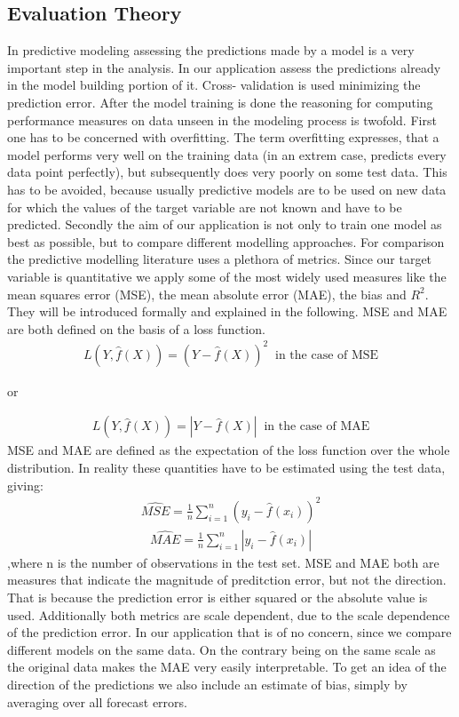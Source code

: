\subsection{Evaluation Theory}
In predictive modeling assessing the predictions made by a model is a very important step in the analysis. In our application assess the predictions already in the model building portion of it. Cross- validation is used minimizing the prediction error. After the model training is done the reasoning for computing performance measures on data unseen in the modeling process is twofold. First one has to be concerned with overfitting. The term overfitting expresses, that a model performs very well on the training data (in an extrem case, predicts every data point perfectly), but subsequently does very poorly on some test data. This has to be avoided, because usually predictive models are to be used on new data for which the values of the target variable are not known and have to be predicted. Secondly the aim of our application is not only to train one model as best as possible, but to compare different modelling approaches. For comparison the predictive modelling literature uses a plethora of metrics. Since our target variable is quantitative we apply some of the most widely used measures like the mean squares error (MSE), the mean absolute error (MAE), the bias and $R^2$. They will be introduced formally and explained in the following. MSE and MAE are both defined on the basis of a loss function. 
\begin{align*}
L(Y,\hat{f}(X))=(Y-\hat{f}(X))^2\;\; \text{in the case of MSE}
\end{align*}
\begin{center}
or
\end{center}
\begin{align*}
L(Y,\hat{f}(X))=|Y-\hat{f}(X)|\;\; \text{in the case of MAE}
\end{align*}
MSE and MAE are defined as the expectation of the loss function over the whole distribution. In reality these quantities have to be estimated using the test data, giving:
\begin{align}
\hat{MSE}=\frac{1}{n}\sum_{i=1}^n(y_i-\hat{f}(x_i))^2
\end{align}
\begin{align}
\hat{MAE}=\frac{1}{n}\sum_{i=1}^n|y_i-\hat{f}(x_i)|
\end{align}
,where n is the number of observations in the test set. MSE and MAE both are measures that indicate the magnitude of preditction error, but not the direction. That is because the prediction error is either squared or the absolute value is used. Additionally both metrics are scale dependent, due to the scale dependence of the prediction error. In our application that is of no concern, since we compare different models on the same data. On the contrary being on the same scale as the original data makes the MAE very easily interpretable. To get an idea of the direction of the predictions we also include an estimate of bias, simply by averaging over all forecast errors.
